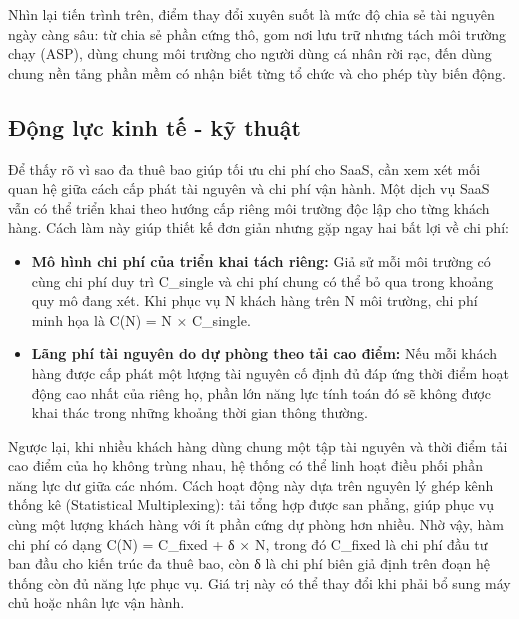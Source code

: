 
Nhìn lại tiến trình trên, điểm thay đổi xuyên suốt là mức độ chia sẻ tài nguyên ngày càng sâu: từ chia sẻ phần cứng thô, gom nơi lưu trữ nhưng tách môi trường chạy (ASP), dùng chung môi trường cho người dùng cá nhân rời rạc, đến dùng chung nền tảng phần mềm có nhận biết từng tổ chức và cho phép tùy biến động.

\subsection{Động lực kinh tế - kỹ thuật}\label{v4-sec-1-1-2}

Để thấy rõ vì sao đa thuê bao giúp tối ưu chi phí cho SaaS, cần xem xét mối quan hệ giữa cách cấp phát tài nguyên và chi phí vận hành. Một dịch vụ SaaS vẫn có thể triển khai theo hướng cấp riêng môi trường độc lập cho từng khách hàng. Cách làm này giúp thiết kế đơn giản nhưng gặp ngay hai bất lợi về chi phí:

\begin{itemize}
\item
  \textbf{Mô hình chi phí của triển khai tách riêng:} Giả sử mỗi môi trường có cùng chi phí duy trì C\_\allowbreak{}single và chi phí chung có thể bỏ qua trong khoảng quy mô đang xét. Khi phục vụ N khách hàng trên N môi trường, chi phí minh họa là C(N) = N × C\_\allowbreak{}single.
\item
  \textbf{Lãng phí tài nguyên do dự phòng theo tải cao điểm:} Nếu mỗi khách hàng được cấp phát một lượng tài nguyên cố định đủ đáp ứng thời điểm hoạt động cao nhất của riêng họ, phần lớn năng lực tính toán đó sẽ không được khai thác trong những khoảng thời gian thông thường.
\end{itemize}

Ngược lại, khi nhiều khách hàng dùng chung một tập tài nguyên và thời điểm tải cao điểm của họ không trùng nhau, hệ thống có thể linh hoạt điều phối phần năng lực dư giữa các nhóm. Cách hoạt động này dựa trên nguyên lý ghép kênh thống kê (Statistical Multiplexing): tải tổng hợp được san phẳng, giúp phục vụ cùng một lượng khách hàng với ít phần cứng dự phòng hơn nhiều. Nhờ vậy, hàm chi phí có dạng C(N) = C\_\allowbreak{}fixed + δ × N, trong đó C\_\allowbreak{}fixed là chi phí đầu tư ban đầu cho kiến trúc đa thuê bao, còn δ là chi phí biên giả định trên đoạn hệ thống còn đủ năng lực phục vụ. Giá trị này có thể thay đổi khi phải bổ sung máy chủ hoặc nhân lực vận hành.

